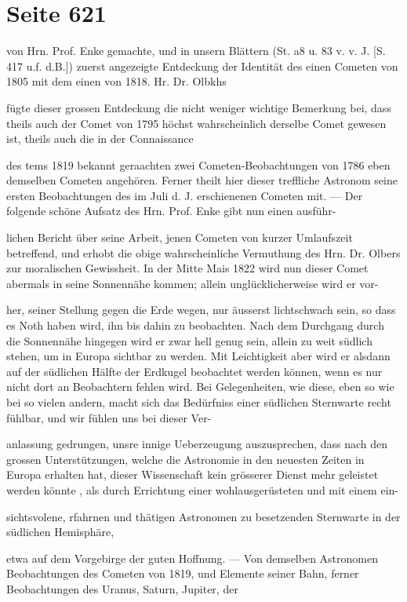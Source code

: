 \documentclass[10pt,a4paper]{article}
\begin{document}
\newpage
\section*{Seite 621}
von Hrn. Prof. Enke gemachte, und in unsern Blättern (St. a8 u. 83 v. v. J. [S. 417 u.f. d.B.]) zuerst angezeigte Entdeckung der Identität des einen Cometen von 1805 mit dem einen von 1818. Hr. Dr. Olbkhs

fügte dieser grossen Entdeckung die nicht weniger wichtige Bemerkung bei, dass theils auch der Comet von 1795 höchst wahrscheinlich derselbe Comet gewesen ist, theils auch die in der Connaissance

des tems 1819 bekannt geraachten zwei Cometen-Beobachtungen von 1786 eben demselben Cometen angehören. Ferner theilt hier dieser treffliche Astronom seine ersten Beobachtungen des im Juli d. J. erschienenen Cometen mit. — Der folgende schöne Aufsatz des Hrn. Prof. Enke gibt nun einen ausführ-

lichen Bericht über seine Arbeit, jenen Cometen von kurzer Umlaufszeit betreffend, und erhobt die obige wahrscheinliche Vermuthung des Hrn. Dr. Olbers zur moralischen Gewissheit. In der Mitte Mais 1822 wird nun dieser Comet abermals in seine Sonnennähe kommen; allein unglücklicherweise wird er vor-

her, seiner Stellung gegen die Erde wegen, nur äusserst lichtschwach sein, so dass es Noth haben wird, ihn bis dahin zu beobachten. Nach dem Durchgang durch die Sonnennähe hingegen wird er zwar hell genug sein, allein zu weit südlich stehen, um in Europa sichtbar zu werden. Mit Leichtigkeit aber wird er alsdann auf der südlichen Hälfte der Erdkugel beobachtet werden können, wenn es nur nicht dort an Beobachtern fehlen wird. Bei Gelegenheiten, wie diese, eben so wie bei so vielen andern, macht sich das Bedürfniss einer südlichen Sternwarte recht fühlbar, und wir fühlen uns bei dieser Ver-

anlassung gedrungen, unsre innige Ueberzeugung auszusprechen, dass nach den grossen Unterstützungen, welche die Astronomie in den neuesten Zeiten in Europa erhalten hat, dieser Wissenschaft kein grösserer Dienst mehr geleistet werden könnte , als durch Errichtung einer wohlausgerüsteten und mit einem ein-

sichtsvolene, rfahrnen und thätigen Astronomen zu besetzenden Sternwarte in der südlichen Hemisphäre,

etwa auf dem Vorgebirge der guten Hoffnung. — Von demselben Astronomen Beobachtungen des Cometen von 1819, und Elemente seiner Bahn, ferner Beobachtungen des Uranus, Saturn, Jupiter, der
\end{document}
